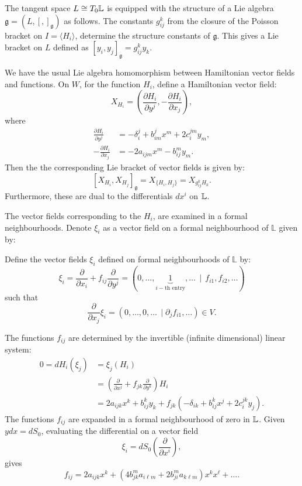     The tangent space \( L \cong T_0\mathbb{L}\) is equipped with the structure of a Lie algebra \( \mathfrak{g} = (L, [, ]_{\mathfrak{g}}) \) as follows. The constants \(g_{ij}^k\) from the closure of the Poisson bracket on \(I = \langle H_i\rangle \), determine the structure constants of \( \mathfrak{g}\). This gives a Lie bracket on \( L\) defined as \( [y_i,y_j]_{\mathfrak{g}} =g_{ij}^k y_k\). 

    We have the usual Lie algebra homomorphism between Hamiltonian vector fields and functions. On \(W\), for the function \(H_i\), define a Hamiltonian vector field:
    \[ X_{H_i} = \left( \frac{\partial H_i}{\partial y^j}, - \frac{\partial H_i}{\partial x_j} \right), \]
    where 
    \begin{align*}
    \frac{\partial H_i}{\partial y^j} &= - \delta_{i}^j +  b_{im}^j x^m + 2 c_{i}^{j m} y_m, \\
    -\frac{\partial H_i}{\partial x_j} &= -2 a_{ijm}x^m -  b_{ij}^m y_m.
    \end{align*}
    Then the the corresponding Lie bracket of vector fields is given by:
    \[ [X_{H_i}, X_{H_j} ]_{\mathfrak{g}} = X_{\{H_i,H_j\}} = X_{g_{ij}^k H_k}. \]
    Furthermore, these are dual to the differentials \(dx^i\) on \( \mathbb{L}\). 

    The vector fields corresponding to the \(H_i\), are examined in a formal neighbourhoods. Denote \( \xi_i\) as a vector field on a formal neighbourhood of \( \mathbb{L}\) given by:
    \begin{defn}
    \label{defn:vectfields} Define the vector fields \( \xi_i\) defined on formal neighbourhoods of \( \mathbb{L}\) by:
    \[ \xi_i=\frac{\partial}{\partial x_i}+ f_{ij}\frac{\partial}{\partial y^j}
    =(0,\dots,\underbrace{1}_{i-\text{th entry}},\dots \, \mid \, f_{i1},f_{i2}, \dots )\]
    such that 
    \[ \frac{\partial}{\partial x_j}\xi_i=(0,\dots,0,\dots\, \mid \partial_j f_{i1},\dots)\in V.\]
    \end{defn}
    The functions \( f_{ij}\) are determined by the invertible (infinite dimensional) linear system:
    \begin{align*}   
    0=dH_i(\xi_j)&=\xi_j(H_i)\\
    &=\left(\frac{\partial}{\partial x^j}+ f_{jk}\frac{\partial}{\partial y^k}\right)H_i\\
    &=2a_{ijk}x^k+b_{ij}^ky_k+ f_{jk}(-\delta_{ik}+ b_{ij}^kx^j+2c_i^{jk}y_j).
    \end{align*}
    The functions \(f_{ij}\) are expanded in a formal neighbourhood of zero in \(  \mathbb{L}\). Given \(y dx = d S_0\), evaluating the differential on a vector field
    \[\xi_i=dS_0\left(\frac{\partial}{\partial x^i}\right),\]
    gives
    \[f_{ij}=2a_{ijk}x^k+(4b_{jk}^ma_{i\ell m}+2b_{ji}^ma_{k\ell m})x^kx^\ell+ \dots. \]
    
